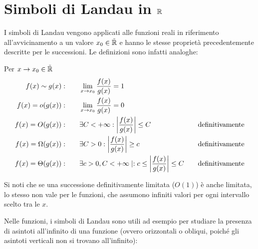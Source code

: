 \section{Simboli di Landau in \texorpdfstring{$\mathbb{R}$}{R}}
I simboli di Landau vengono applicati alle funzioni reali in riferimento all'avvicinamento a un valore $x_0\in\tilde{\mathbb{R}}$ e hanno le stesse proprietà precedentemente descritte per le successioni. Le definizioni sono infatti analoghe:
\begin{defin}
	Per $x\to x_0\in\tilde{\mathbb{R}}$
	\begin{align*}
		f(x)\sim g(x):     & \qquad \lim_{x\to x_0} \frac{f(x)}{g(x)}=1\quad                            &                        & \\
		f(x)=o(g(x)):      & \qquad \lim_{x\to x_0} \frac{f(x)}{g(x)}=0\quad                            &                        & \\
		f(x)=O(g(x)):      & \qquad \exists C<+\infty: \left\lvert \frac{f(x)}{g(x)} \right\rvert\leq C\quad               & \text{definitivamente} & \\
		f(x)=\Omega(g(x)): & \qquad \exists C>0: \left\lvert \frac{f(x)}{g(x)} \right\rvert\geq c\quad                     & \text{definitivamente} & \\
		f(x)=\Theta(g(x)): & \qquad \exists c>0,C<+\infty\mid: c\leq \left\lvert \frac{f(x)}{g(x)} \right\rvert\leq C\quad & \text{definitivamente} &
	\end{align*}
\end{defin}
Si noti che se una successione definitivamente limitata ($O(1)$) è anche limitata, lo stesso non vale per le funzioni, che assumono infiniti valori per ogni intervallo scelto tra le $x$.

Nelle funzioni, i simboli di Landau sono utili ad esempio per studiare la presenza di asintoti all'infinito di una funzione (ovvero orizzontali o obliqui, poiché gli asintoti verticali non si trovano all'infinito):
